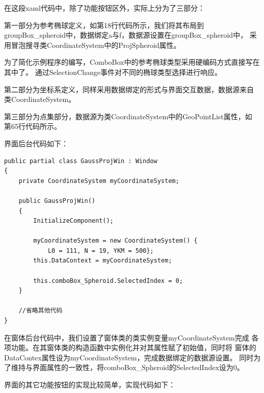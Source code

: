 在这段xaml代码中，除了功能按钮区外，实际上分为了三部分：

第一部分为参考椭球定义，如第18行代码所示，我们将其布局到
 groupBox\_spheroid中，数据绑定a与f，数据源设置在groupBox\_spheroid中，
 采用冒泡搜寻类CoordinateSystem中的ProjSpheroid属性。

为了简化示例程序的编写，ComboBox中的参考椭球类型采用硬编码方式直接写在其中了。
通过SelectionChange事件对不同的椭球类型选择进行响应。

第二部分为坐标系定义，同样采用数据绑定的形式与界面交互数据，数据源来自
类CoordinateSystem。

第三部分为点集部分，数据源为类CoordinateSystem中的GeoPointList属性，如
第65行代码所示。

界面后台代码如下：

\begin{lstlisting}
public partial class GaussProjWin : Window
{       
    private CoordinateSystem myCoordinateSystem;

    public GaussProjWin()
    {
        InitializeComponent();

        myCoordinateSystem = new CoordinateSystem() {
            L0 = 111, N = 19, YKM = 500};
        this.DataContext = myCoordinateSystem;

        this.comboBox_Spheroid.SelectedIndex = 0;
    }

    //省略其他代码
}
\end{lstlisting}

在窗体后台代码中，我们设置了窗体类的类实例变量myCoordinateSystem完成
各项功能。在其窗体类的构造函数中实例化并对其属性赋了初始值，同时将
窗体的DataContex属性设为myCoordinateSystem，完成数据绑定的数据源设置。
同时为了维持与界面属性的一致性，将comboBox\_Spheroid的SelectedIndex设为0。

界面的其它功能按钮的实现比较简单，实现代码如下：

